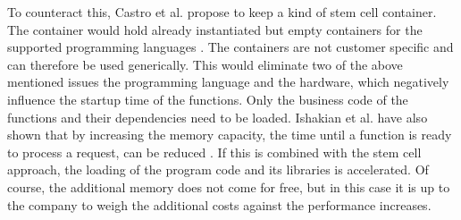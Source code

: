 \documentclass[11pt]{article}
\begin{document}
To counteract this, Castro et al. propose to keep a kind of stem cell container. The container would hold already instantiated but empty containers for the supported programming languages \cite{castro2019server}. The containers are not customer specific and can therefore be used generically. This would eliminate two of the above mentioned issues the programming language and the hardware, which negatively influence the startup time of the functions. Only the business code of the functions and their dependencies need to be loaded. Ishakian et al. have also shown that by increasing the memory capacity, the time until a function is ready to process a request, can be reduced \cite{ishakian2018serving}. If this is combined with the stem cell approach, the loading of the program code and its libraries is accelerated. Of course, the additional memory does not come for free, but in this case it is up to the company to weigh the additional costs against the performance increases.
 \newpage
\end{document}
